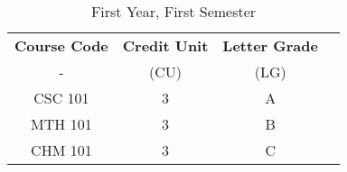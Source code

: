 \documentclass{article}
\begin{document}
	
	\begin{table}[h!]
		\begin{center}
			\caption{First Year, First Semester}
		    \label{tab:table1}
		    \begin{tabular}{c|c|c|c|}
		    	\textbf{Course Code} & \textbf{Credit Unit} & 
		    	\textbf{Letter Grade}\\
		    	- & (CU) & (LG) \\
		    	\hline
		    	CSC 101 & 3 & A\\
		    	MTH 101 & 3 & B\\
		    	CHM 101 & 3 & C\\
		    	\end{tabular}
	    	\end{center}
    	\end{table}
    
\end{document}
